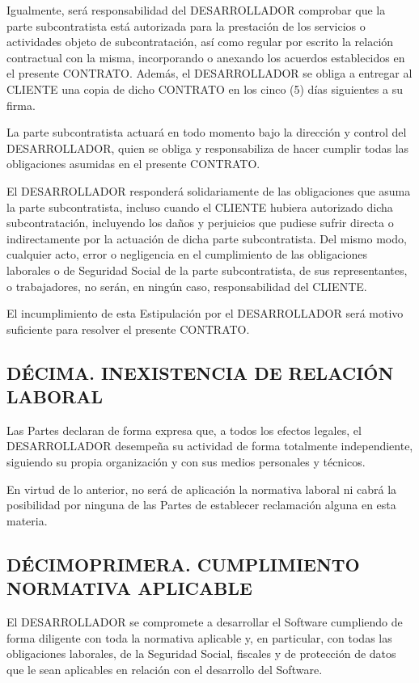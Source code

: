 \documentclass[a4paper,11pt]{report}
\begin{document}
	Igualmente, será responsabilidad del DESARROLLADOR comprobar que la
	parte subcontratista está autorizada para la prestación de los servicios
	o actividades objeto de subcontratación, así como regular por escrito la
	relación contractual con la misma, incorporando o anexando los acuerdos
	establecidos en el presente CONTRATO. Además, el DESARROLLADOR se obliga
	a entregar al CLIENTE una copia de dicho CONTRATO en los cinco (5) días
	siguientes a su firma.

	La parte subcontratista actuará en todo momento bajo la dirección y
	control del DESARROLLADOR, quien se obliga y responsabiliza de hacer
	cumplir todas las obligaciones asumidas en el presente CONTRATO.

	El DESARROLLADOR responderá solidariamente de las obligaciones que asuma
	la parte subcontratista, incluso cuando el CLIENTE hubiera autorizado
	dicha subcontratación, incluyendo los daños y perjuicios que pudiese
	sufrir directa o indirectamente por la actuación de dicha parte
	subcontratista. Del mismo modo, cualquier acto, error o negligencia en
	el cumplimiento de las obligaciones laborales o de Seguridad Social de
	la parte subcontratista, de sus representantes, o trabajadores, no
	serán, en ningún caso, responsabilidad del CLIENTE.

	El incumplimiento de esta Estipulación por el DESARROLLADOR será motivo
	suficiente para resolver el presente CONTRATO.

	\subsection*{DÉCIMA. INEXISTENCIA DE RELACIÓN LABORAL}

	Las Partes declaran de forma expresa que, a todos los efectos legales,
	el DESARROLLADOR desempeña su actividad de forma totalmente
	independiente, siguiendo su propia organización y con sus medios
	personales y técnicos.

	En virtud de lo anterior, no será de aplicación la normativa laboral ni
	cabrá la posibilidad por ninguna de las Partes de establecer reclamación
	alguna en esta materia.

	\subsection*{DÉCIMOPRIMERA. CUMPLIMIENTO NORMATIVA APLICABLE}

	El DESARROLLADOR se compromete a desarrollar el Software cumpliendo de
	forma diligente con toda la normativa aplicable y, en particular, con
	todas las obligaciones laborales, de la Seguridad Social, fiscales y de
	protección de datos que le sean aplicables en relación con el desarrollo
	del Software.
\end{document}
